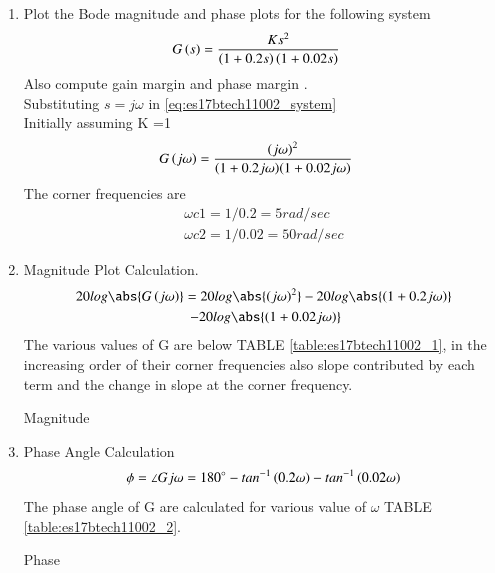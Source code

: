 \begin{enumerate}[label=\thesection.\arabic*.,ref=\thesection.\theenumi]
\item Plot the Bode magnitude and phase plots for the following system
\begin{align}
G\brak{s} &= \frac{Ks^2}{{\brak{1+0.2s}{\brak{1+0.02s}}}}
\label{eq:es17btech11002_system}
\end{align}
Also compute gain margin and phase margin .
\\
\solution Substituting $s=j\omega$ in   \eqref{eq:es17btech11002_system} 
\\
Initially assuming K =1
\begin{align}
G\left(j\omega\right)&=\frac{\left(j\omega\right)^2}{{\left(1+0.2j\omega\right)}{\left(1+0.02j\omega\right)}}
\end{align}
The corner frequencies are
\begin{align}
\omega{c1}=1/0.2 = 5rad/sec
\\
\omega{c2}=1/0.02 = 50rad/sec
\end{align}
\item Magnitude Plot Calculation.
\\
\solution
\begin{multline}
20log\abs{G\brak{j\omega}} = 20log\abs{\brak{j\omega}^2}-20log\abs{\brak{1+0.2j\omega}}\\\ -20log\abs{\brak{1+0.02j\omega}}
\end{multline}
The various values of G are below TABLE  \ref{table:es17btech11002_1}, in the increasing order of their corner frequencies also slope contributed by each term and the change in slope at the corner frequency.
\begin{table}[!ht]
\centering

\caption{Magnitude}
\label{table:es17btech11002_1}
\end{table}
\item Phase Angle Calculation
\\
\solution
\begin{align}
\phi = \angle{Gj\omega}= 180\degree-tan^{-1}\left(0.2\omega\right)-tan^{-1}\left(0.02\omega\right)
\end{align}
The phase angle of G are calculated for various value of $\omega$ TABLE \ref{table:es17btech11002_2}.
\begin{table}[!ht]
\centering

\caption{Phase}
\label{table:es17btech11002_2}
\end{table}
\\

\end{enumerate}
